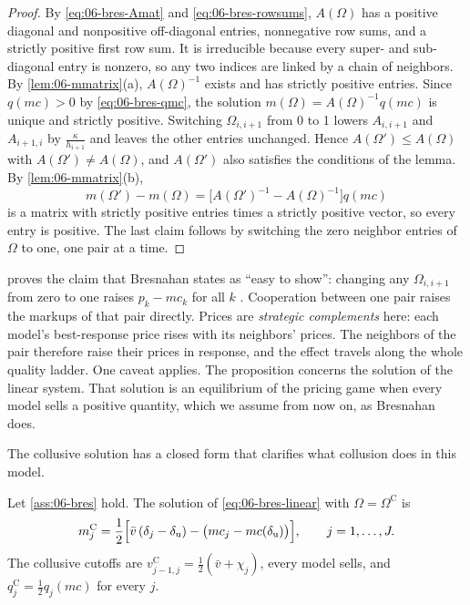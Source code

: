 \begin{proof}
By \eqref{eq:06-bres-Amat} and \eqref{eq:06-bres-rowsums}, $A(\Omega)$ has a positive diagonal and nonpositive
off-diagonal entries, nonnegative row sums, and a strictly positive first row sum. It is irreducible because every
super- and sub-diagonal entry is nonzero, so any two indices are linked by a chain of neighbors. By
\cref{lem:06-mmatrix}(a), $A(\Omega)^{-1}$ exists and has strictly positive entries. Since $q(mc) > 0$ by
\eqref{eq:06-bres-qmc}, the solution $m(\Omega) = A(\Omega)^{-1}q(mc)$ is unique and strictly positive. Switching
$\Omega_{i,i+1}$ from 0 to 1 lowers $A_{i,i+1}$ and $A_{i+1,i}$ by $\frac{\kappa}{h_{i+1}}$ and leaves the other entries
unchanged. Hence $A(\Omega') \le A(\Omega)$ with $A(\Omega') \ne A(\Omega)$, and $A(\Omega')$ also satisfies the
conditions of the lemma. By \cref{lem:06-mmatrix}(b),
\begin{equation*}
  m(\Omega') - m(\Omega) = \bigl[A(\Omega')^{-1} - A(\Omega)^{-1}\bigr]q(mc)
\end{equation*}
is a matrix with strictly positive entries times a strictly positive vector, so every entry is positive. The last
claim follows by switching the zero neighbor entries of $\Omega$ to one, one pair at a time.
\end{proof}

 proves the claim that Bresnahan states as ``easy to show'': changing any
$\Omega_{i,i+1}$ from zero to one raises $p_k - mc_k$ for all $k$ \citep[p.~465]{Bresnahan1987}. Cooperation between
one pair raises the markups of that pair directly. Prices are \emph{strategic complements} here: each model's
best-response price rises with its neighbors' prices. The neighbors of the pair therefore raise their prices in
response, and the effect travels along the whole quality ladder. One caveat applies.
The proposition concerns the solution of the linear system. That solution is an equilibrium of the pricing game
when every model sells a positive quantity, which we assume from now on, as Bresnahan does.

The collusive solution has a closed form that clarifies what collusion does in this model.

\begin{proposition}\label{prop:06-bres-collusion}
Let \cref{ass:06-bres} hold. The solution of \eqref{eq:06-bres-linear} with $\Omega = \Omega^{\mathrm C}$ is
\begin{equation}\label{eq:06-bres-mC}
  m_j^{\mathrm C} = \frac{1}{2}\Bigl[\bar v\,(\delta_j - \delta_{\mathrm u}) - \bigl(mc_j - mc(\delta_{\mathrm u})\bigr)\Bigr],
  \qquad j = 1,\dots,J .
\end{equation}
The collusive cutoffs are $v^{\mathrm C}_{j-1,j} = \frac{1}{2}(\bar v + \chi_j)$, every model sells, and
$q_j^{\mathrm C} = \frac{1}{2}q_j(mc)$ for every $j$.
\end{proposition}

